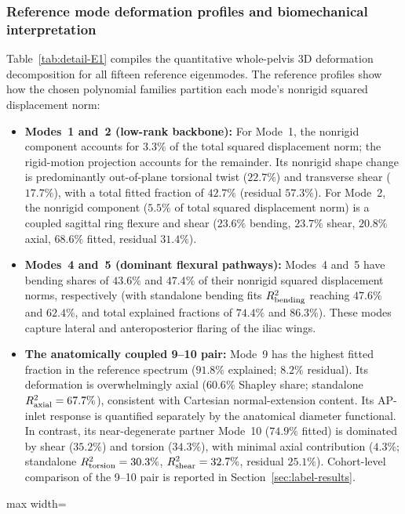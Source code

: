 \documentclass[pdflatex,sn-basic]{sn-jnl}
\newcommand{\DetailTableInput}[1]{\begingroup\footnotesize\setlength{\tabcolsep}{4pt}\renewcommand{\arraystretch}{1.05}\noindent\centering\begin{adjustbox}{max width=\linewidth}\end{adjustbox}\par\endgroup}
\begin{document}
\subsubsection{Reference mode deformation profiles and biomechanical interpretation}
Table~\ref{tab:detail-E1} compiles the quantitative whole-pelvis 3D deformation decomposition for all fifteen reference eigenmodes.
The reference profiles show how the chosen polynomial families partition each mode's nonrigid squared displacement norm:
\begin{itemize}
\item \textbf{Modes~1 and~2 (low-rank backbone):}
For Mode~1, the nonrigid component accounts for $3.3\%$ of the total squared displacement norm; the rigid-motion projection accounts for the remainder.
Its nonrigid shape change is predominantly out-of-plane torsional twist ($22.7\%$) and transverse shear ($17.7\%$), with a total fitted fraction of $42.7\%$ (residual $57.3\%$).
For Mode~2, the nonrigid component ($5.5\%$ of total squared displacement norm) is a coupled sagittal ring flexure and shear ($23.6\%$ bending, $23.7\%$ shear, $20.8\%$ axial, $68.6\%$ fitted, residual $31.4\%$).

\item \textbf{Modes~4 and~5 (dominant flexural pathways):}
Modes~4 and~5 have bending shares of $43.6\%$ and $47.4\%$ of their nonrigid squared displacement norms, respectively (with standalone bending fits $R^2_{\rm bending}$ reaching $47.6\%$ and $62.4\%$, and total explained fractions of $74.4\%$ and $86.3\%$).
These modes capture lateral and anteroposterior flaring of the iliac wings.

\item \textbf{The anatomically coupled 9--10 pair:}
Mode~9 has the highest fitted fraction in the reference spectrum ($91.8\%$ explained; $8.2\%$ residual).
Its deformation is overwhelmingly axial ($60.6\%$ Shapley share; standalone $R^2_{\rm axial} = 67.7\%$), consistent with Cartesian normal-extension content. Its AP-inlet response is quantified separately by the anatomical diameter functional.
In contrast, its near-degenerate partner Mode~10 ($74.9\%$ fitted) is dominated by shear ($35.2\%$) and torsion ($34.3\%$), with minimal axial contribution ($4.3\%$; standalone $R^2_{\rm torsion} = 30.3\%$, $R^2_{\rm shear} = 32.7\%$, residual $25.1\%$).
Cohort-level comparison of the 9--10 pair is reported in Section~\ref{sec:label-results}.
\end{itemize}


\begin{table}[!htbp]
\caption{Reference mode whole-pelvis 3D deformation decomposition. }
\label{tab:detail-E1}
\centering
\DetailTableInput{global_deformation_modes_table.tex}
\end{table}
\end{document}
